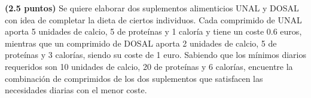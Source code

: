 
\textbf{(2.5 puntos)} Se quiere elaborar dos suplementos alimenticios UNAL
y DOSAL con idea de completar la dieta de ciertos individuos. Cada comprimido
de UNAL aporta 5 unidades de calcio, 5 de proteínas y 1 caloría y tiene un
coste 0.6 euros, mientras que un comprimido de DOSAL aporta 2 unidades de
calcio, 5 de proteínas y 3 calorías, siendo su coste de 1 euro. Sabiendo que
los mínimos diarios requeridos son 10 unidades de calcio, 20 de proteínas
y 6 calorías, encuentre la combinación de comprimidos de los dos suplementos
que satisfacen las necesidades diarias con el menor coste.
